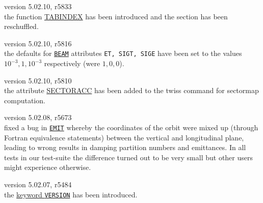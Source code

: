 \begin{madlist}

 
  

   version 5.02.10, r5833\\
  the function \hyperref[subsubsec:table]{TABINDEX} has been introduced and the section has been reschuffled.


   version 5.02.10, r5816\\
  the defaults for \hyperref[sec:beam]{\texttt{BEAM}} attributes \texttt{ET, SIGT, SIGE} have been set to the values $10^{-3}, 1, 10^{-3}$ respectively (were $1, 0, 0$).

   version 5.02.10, r5810\\
  the attribute \hyperref[chap:twiss]{SECTORACC} has been added to the twiss command for sectormap computation.

   version 5.02.08, r5673\\
  fixed a bug in \hyperref[chap:emit]{\texttt{EMIT}} whereby the
  coordinates of the orbit were mixed up (through Fortran equivalence
  statements) between the vertical and longitudinal plane, leading to
  wrong results in damping partition numbers and emittances. In all tests
  in our test-suite the difference turned out to be very small but other
  users might experience otherwise.

   version 5.02.07, r5484\\
  the \hyperref[subsec:keyword]{keyword \texttt{VERSION}} has been introduced.
  

\end{madlist}
